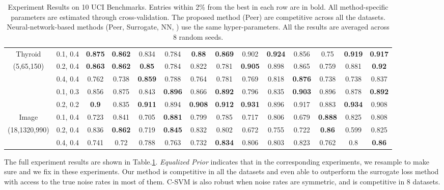 \begin{table}[ht]
\begin{tabular}{|c|c|c|c|c|c|c|c|c|c|c|c|c|c|}
Thyroid        & 0.1, 0.4   & \textbf{0.875} & \textbf{0.862}     & 0.834     & 0.784 & \textbf{0.88}  & \textbf{0.869 }
               & 0.902 & \textbf{0.924}     & 0.856     & 0.75  & \textbf{0.919} & \textbf{0.917} \\
(5,65,150)     & 0.2, 0.4   & \textbf{0.863} & \textbf{0.862}     & \textbf{0.85}      & 0.784 & 0.822 & 0.781 
               & \textbf{0.905} & 0.898     & 0.865     & 0.759 & 0.881 & \textbf{0.92}  \\
               & 0.4, 0.4   & 0.762 & 0.738     & \textbf{0.859}     & 0.788 & 0.764 & 0.781 
               & 0.769 & 0.818     & \textbf{0.876}     & 0.738 & 0.738 & 0.837 \\ \hline
               & 0.1, 0.3   & 0.856 & 0.875     & 0.843     & \textbf{0.896} & 0.866 & \textbf{0.892} 
               & 0.796 & 0.835     & \textbf{0.903}     & 0.896 & 0.878 & \textbf{0.892} \\ 
               & 0.2, 0.2   & \textbf{0.9}   & 0.835     & \textbf{0.911}     & 0.894 & \textbf{0.908} & \textbf{0.912} 
               & \textbf{0.931} & 0.896     & 0.917     & 0.883 & \textbf{0.934} & 0.908 \\
Image          & 0.1, 0.4   & 0.723 & 0.841     & 0.705     & \textbf{0.881} & 0.799 & 0.785 
               & 0.717 & 0.806     & 0.679     & \textbf{0.888} & 0.825 & 0.808 \\
(18,1320,990)  & 0.2, 0.4   & 0.836 & \textbf{0.862}     & 0.719     & \textbf{0.845} & 0.832 & 0.802 
               & 0.672 & 0.755     & 0.722     & \textbf{0.86}  & 0.599 & 0.825 \\
               & 0.4, 0.4   & 0.741 & 0.72      & 0.788     & 0.763 & 0.732 & \textbf{0.834} 
               & 0.806 & 0.803     & 0.823     & 0.762 & 0.8   & \textbf{0.86}  \\ \hline
\end{tabular}
\caption{Experiment Results on 10 UCI Benchmarks. Entries within 2\% from the best in each row are in bold.  All method-specific parameters are estimated through cross-validation. The proposed method (Peer) are competitive across all the datasets. Neural-network-based methods (Peer, Surrogate, NN, ) use the same hyper-parameters. All the results are averaged across 8 random seeds.}
\label{tab:uci}
\end{table}

The full experiment results are shown in Table.\ref{tab:uci}. \textit{Equalized Prior} indicates that in the corresponding experiments, we resample to make sure  and we fix  in these experiments. Our method is competitive in all the datasets and even able to outperform the surrogate loss method with access to the true noise rates in most of them. C-SVM is also robust when noise rates are symmetric, and is competitive in 8 datasets.

